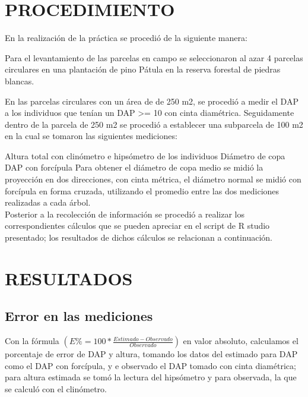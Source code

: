 \documentclass[letterpaper,9pt,twocolumn,twoside,]{pinp}
\begin{document}
\hypertarget{procedimiento}{%
\section{PROCEDIMIENTO}\label{procedimiento}}

En la realización de la práctica se procedió de la siguiente manera:

Para el levantamiento de las parcelas en campo se seleccionaron al azar
4 parcelas circulares en una plantación de pino Pátula en la reserva
forestal de piedras blancas.

En las parcelas circulares con un área de de 250 m2, se procedió a medir
el DAP a los individuos que tenían un DAP \textgreater{}= 10 con cinta
diamétrica. Seguidamente dentro de la parcela de 250 m2 se procedió a
establecer una subparcela de 100 m2 en la cual se tomaron las siguientes
mediciones:

Altura total con clinómetro e hipsómetro de los individuos Diámetro de
copa DAP con forcípula Para obtener el diámetro de copa medio se midió
la proyección en dos direcciones, con cinta métrica, el diámetro normal
se midió con forcípula en forma cruzada, utilizando el promedio entre
las dos mediciones realizadas a cada árbol.\\
Posterior a la recolección de información se procedió a realizar los
correspondientes cálculos que se pueden apreciar en el script de R
studio presentado; los resultados de dichos cálculos se relacionan a
continuación.

\hypertarget{resultados}{%
\section{RESULTADOS}\label{resultados}}

\hypertarget{error-en-las-mediciones}{%
\subsection{Error en las mediciones}\label{error-en-las-mediciones}}

Con la fórmula \((E\% = 100 * \frac{Estimado-Observado}{Observado})\) en
valor absoluto, calculamos el porcentaje de error de DAP y altura,
tomando los datos del estimado para DAP como el DAP con forcípula, y e
observado el DAP tomado con cinta diamétrica; para altura estimada se
tomó la lectura del hipsómetro y para observada, la que se calculó con
el clinómetro.

\begin{Shaded}
\begin{Highlighting}[]
\end{Highlighting}
\end{Shaded}
\end{document}
